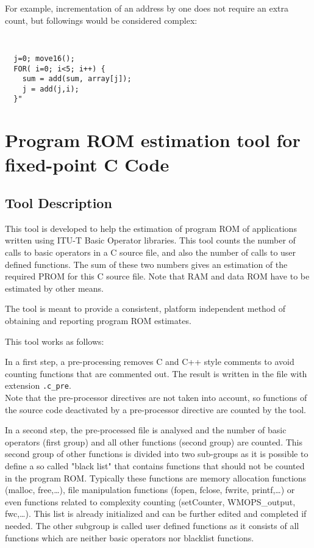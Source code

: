 For example, incrementation of an address by one does not require an
extra count, but followings would be considered complex:
{\tt\small
\begin{verbatim}
  j=0; move16();
  FOR( i=0; i<5; i++) {
    sum = add(sum, array[j]);
    j = add(j,i);
  }"
\end{verbatim}
} %

\section{Program ROM estimation tool for fixed-point C Code}

\subsection{Tool Description }
This tool is developed to help the estimation of program ROM of
applications written using ITU-T Basic Operator libraries. This tool
counts the number of calls to basic operators in a C source file, and
also the number of calls to user defined functions. The sum of these
two numbers gives an estimation of the required PROM for this C source
file. Note that RAM and data ROM have to be estimated by other means.

The tool is meant to provide a consistent, platform independent method
of obtaining and reporting program ROM estimates.

This tool works as follows:
\begin{list}{-}
\item In a first step, a pre-processing removes C and C++ style
  comments to avoid counting functions that are commented out. The
  result is written in the file with extension {\tt .c\_pre}.\\
  Note that the pre-processor directives are not taken into account,
  so functions of the source code deactivated by a pre-processor
  directive are counted by the tool.
\item In a second step, the pre-processed file is analysed and the
  number of basic operators (first group) and all other functions
  (second group) are counted. This second group of other functions is
  divided into two sub-groups as it is possible to define a so called
  "black list" that contains functions that should not be counted in
  the program ROM. Typically these functions are memory allocation
  functions (malloc, free,\dots), file manipulation functions (fopen,
  fclose, fwrite, printf,\dots) or even functions related to complexity
  counting (setCounter, WMOPS\_output, fwc,\dots). This list is
  already initialized and can be further edited and completed if
  needed. The other subgroup is called user defined functions as it
  consists of all functions which are neither basic operators nor
  blacklist functions.
\end{list}

